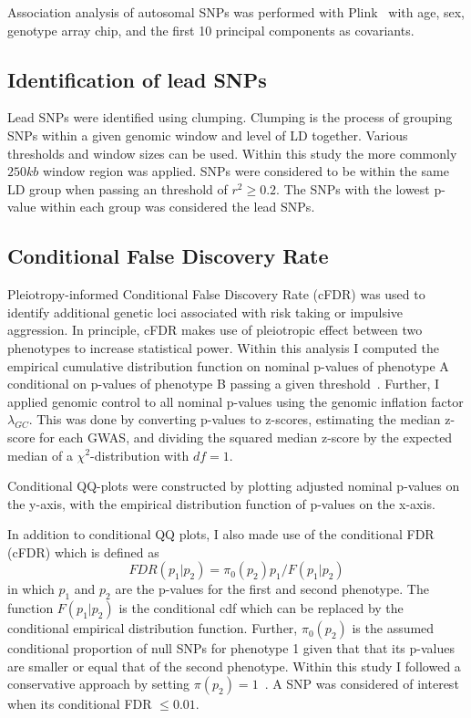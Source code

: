 Association analysis of autosomal SNPs was performed with Plink~\cite{Purcell2007,Chang2015} with age, sex, genotype array chip, and the first 10 principal components as covariants.

\subsection{Identification of lead SNPs}
\label{sub:Clumping}

Lead SNPs were identified using clumping.
Clumping is the process of grouping SNPs within a given genomic window and level of LD together.
Various thresholds and window sizes can be used.
Within this study the more commonly $250kb$ window region was applied.
SNPs were considered to be within the same LD group when passing an threshold of $r^2 \ge 0.2$.
The SNPs with the lowest p-value within each group was considered the lead SNPs.

\subsection{Conditional False Discovery Rate}
\label{sub:conditional_false_discovery_rate}

Pleiotropy-informed Conditional False Discovery Rate (cFDR) was used to identify additional genetic loci associated with risk taking or impulsive aggression. 
In principle, cFDR makes use of pleiotropic effect between two phenotypes to increase statistical power.
Within this analysis I computed the empirical cumulative distribution function on nominal p-values of phenotype A conditional on p-values of phenotype B passing a given threshold~\cite{Andreassen2013}.
Further, I applied genomic control to all nominal p-values using the genomic inflation factor $\lambda_{GC}$.
This was done by converting p-values to z-scores, estimating the median z-score for each GWAS, and dividing the squared median z-score by the expected median of a $\chi^2$-distribution  with $df=1$.

Conditional QQ-plots were constructed by plotting adjusted nominal p-values on the y-axis, with the empirical distribution function of p-values on the x-axis.

In addition to conditional QQ plots, I also made use of the conditional FDR (cFDR) which is defined as~\cite{Andreassen2013}
\begin{equation}
  FDR(p_1|p_2)=\pi_0(p_2)p_1/F(p_1|p_2)
\end{equation}
in which $p_1$ and $p_2$ are the p-values for the first and second phenotype.
The function $F(p_1|p_2)$ is the conditional cdf which can be replaced by the conditional empirical distribution function.
Further, $\pi_0(p_2)$ is the assumed conditional proportion of null SNPs for phenotype 1 given that that its p-values are smaller or equal that of the second phenotype.
Within this study I followed a conservative approach by setting $\pi(p_2)=1$~\cite{Andreassen2013}.
A SNP was considered of interest when its conditional FDR $\leq 0.01$.

